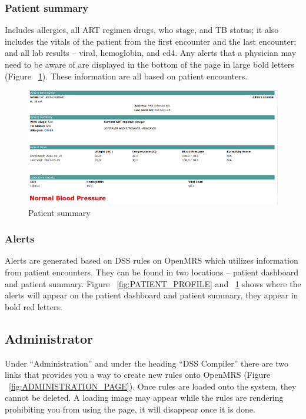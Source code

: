\documentclass[12pt,letterpaper]{article}
\begin{document}
\subsubsection{Patient summary}
	Includes allergies, all ART regimen drugs, who stage, and TB status; it also includes the vitals of the patient from the first encounter and the last encounter; and all lab results – viral, hemoglobin, and cd4. Any alerts that a physician may need to be aware of are displayed in the bottom of the page in large bold letters (Figure ~\ref{fig:PATIENT_SUMMARY}). These information are all based on patient encounters.

\begin{figure}\begin{center}
\includegraphics[width=6.5in]{user_guide/patient_summary.png}
\end{center}
\caption{Patient summary}
\label{fig:PATIENT_SUMMARY}
\end{figure}


\subsubsection{Alerts}
	Alerts are generated based on DSS rules on OpenMRS which utilizes information from patient encounters. They can be found in two locations – patient dashboard and patient summary. Figure ~\ref{fig:PATIENT_PROFILE} and ~\ref{fig:PATIENT_SUMMARY} shows where the alerts will appear on the patient dashboard and patient summary, they appear in bold red letters.

\subsection{Administrator}
	Under “Administration” and under the heading “DSS Compiler” there are two links that provides you a way to create new rules onto OpenMRS (Figure 
	~\ref{fig:ADMINISTRATION_PAGE}). Once rules are loaded onto the system, they cannot be deleted. A loading image may appear while the rules are rendering prohibiting you from using the page, it will disappear once it is done.
\end{document}
